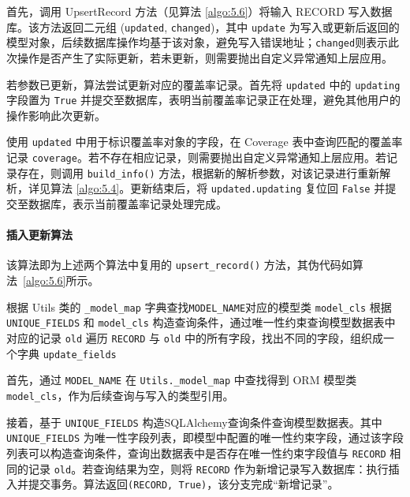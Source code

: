 首先，调用 UpsertRecord 方法（见算法 \ref{algo:5.6}）将输入 RECORD 写入数据库。该方法返回二元组 (\verb|updated|, \verb|changed|)，其中 \verb|update| 为写入或更新后返回的模型对象，后续数据库操作均基于该对象，避免写入错误地址；\verb|changed|则表示此次操作是否产生了实际更新，若未更新，则需要抛出自定义异常通知上层应用。

若参数已更新，算法尝试更新对应的覆盖率记录。首先将 \verb|updated| 中的 \verb|updating| 字段置为 \verb|True| 并提交至数据库，表明当前覆盖率记录正在处理，避免其他用户的操作影响此次更新。

使用 \verb|updated| 中用于标识覆盖率对象的字段，在 Coverage 表中查询匹配的覆盖率记录 \verb|coverage|。若不存在相应记录，则需要抛出自定义异常通知上层应用。若记录存在，则调用 \verb|build_info()| 方法，根据新的解析参数，对该记录进行重新解析，详见算法 \ref{algo:5.4}。更新结束后，将 \verb|updated.updating| 复位回 \verb|False| 并提交至数据库，表示当前覆盖率记录处理完成。

\paragraph{\textbf{插入更新算法}}
该算法即为上述两个算法中复用的 \verb|upsert_record()| 方法，其伪代码如算法~\ref{algo:5.6}所示。

\begin{algorithm}[ht]
\caption{细粒度分析-接口适配层-插入更新算法}
\label{algo:5.6}

根据 Utils 类的 \texttt{\_model\_map} 字典查找\texttt{MODEL\_NAME}对应的模型类 \texttt{model\_cls} \;
根据 \texttt{UNIQUE\_FIELDS} 和 \texttt{model\_cls} 构造查询条件，通过唯一性约束查询模型数据表中对应的记录 \texttt{old}\;
遍历 \texttt{RECORD} 与 \texttt{old} 中的所有字段，找出不同的字段，组织成一个字典 \texttt{update\_fields} \;
\end{algorithm}

首先，通过 \verb|MODEL_NAME| 在 \verb|Utils._model_map| 中查找得到 ORM 模型类 \verb|model_cls|，作为后续查询与写入的类型引用。

接着，基于 \verb|UNIQUE_FIELDS| 构造SQLAlchemy查询条件查询模型数据表。其中 \verb|UNIQUE_FIELDS| 为唯一性字段列表，即模型中配置的唯一性约束字段，通过该字段列表可以构造查询条件，查询出数据表中是否存在唯一性约束字段值与 \verb|RECORD| 相同的记录 \verb|old|。若查询结果为空，则将 \verb|RECORD| 作为新增记录写入数据库：执行插入并提交事务。算法返回\verb|(RECORD, True)|，该分支完成“新增记录”。

